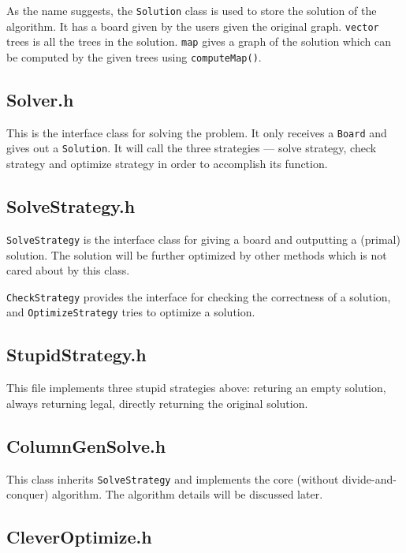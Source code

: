 \documentclass[12pt, a4paper]{article}
\begin{document}
			As the name suggests, the \texttt{Solution} class is used to store the solution of the algorithm. It has a board given by the users given the original graph. \texttt{vector} trees is all the trees in the solution. \texttt{map} gives a graph of the solution which can be computed by the given trees using \texttt{computeMap()}.
		
		\subsection{Solver.h}
		
			This is the interface class for solving the problem. It only receives a \texttt{Board} and gives out a \texttt{Solution}. It will call the three strategies --- solve strategy, check strategy and optimize strategy in order to accomplish its function.
		
		\subsection{SolveStrategy.h}
		
			\texttt{SolveStrategy} is the interface class for giving a board and outputting a (primal) solution. The solution will be further optimized by other methods which is not cared about by this class.
			
			\texttt{CheckStrategy} provides the interface for checking the correctness of a solution, and \texttt{OptimizeStrategy} tries to optimize a solution.
		
		\subsection{StupidStrategy.h}
			
			This file implements three stupid strategies above: returing an empty solution, always returning legal, directly returning the original solution.
		
		\subsection{ColumnGenSolve.h}
		
			This class inherits \texttt{SolveStrategy} and implements the core (without divide-and-conquer) algorithm. The algorithm details will be discussed later.
		
		\subsection{CleverOptimize.h}
		
\end{document}
